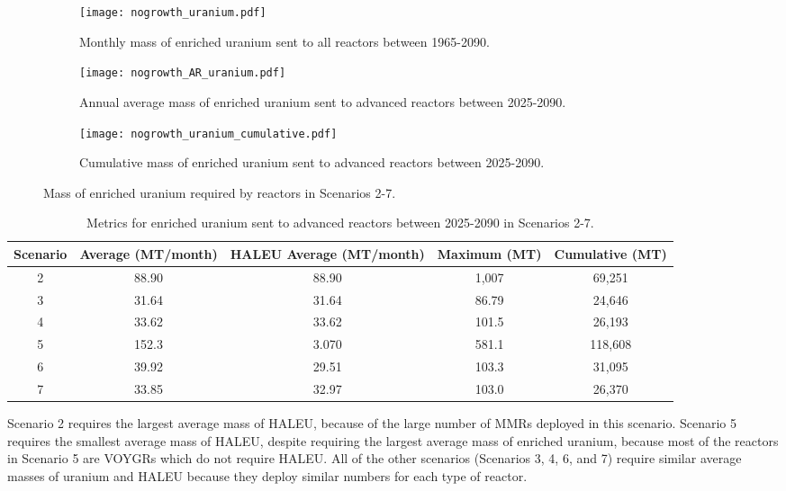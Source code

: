 \begin{figure}
    \centering
    \begin{subfigure}[b]{0.45\textwidth}
        \centering
        \texttt{[image: nogrowth\_uranium.pdf]}
        \caption{Monthly mass of enriched uranium sent to all reactors 
        between 1965-2090.}
        \label{fig:nogrowth_all_uranium}
    \end{subfigure}
    \hfill
    \begin{subfigure}[b]{0.45\textwidth}
        \centering
        \texttt{[image: nogrowth\_AR\_uranium.pdf]}
        \caption{Annual average mass of enriched uranium sent to 
        advanced reactors between 2025-2090.}
        \label{fig:nogrowth_AR_uranium}
    \end{subfigure}
    \begin{subfigure}[b]{0.45\textwidth}
        \centering
        \texttt{[image: nogrowth\_uranium\_cumulative.pdf]}
        \caption{Cumulative mass of enriched 
        uranium sent to advanced reactors between 2025-2090.}
        \label{fig:nogrowth_uranium_cumulative}
    \end{subfigure}
       \caption{Mass of enriched uranium required by reactors
        in Scenarios 2-7.}
       \label{fig:nogrowth_uranium}
\end{figure}

\begin{table}
    \centering 
    \caption{Metrics for enriched uranium sent to advanced 
    reactors between 2025-2090 in Scenarios 2-7.}
    \label{tab:nogrowth_uranium}
    \begin{tabular}{c c c c c}
        \hline
        Scenario & Average (MT/month) & \gls{HALEU} Average 
        (MT/month) & Maximum (MT)& Cumulative (MT)\\\hline
        2 & 88.90 & 88.90 & 1,007 & 69,251\\
        3 & 31.64 & 31.64 & 86.79 & 24,646\\
        4 & 33.62 & 33.62 & 101.5 & 26,193\\
        5 & 152.3 & 3.070 & 581.1 & 118,608\\
        6 & 39.92 & 29.51 & 103.3 & 31,095\\
        7 & 33.85 & 32.97 & 103.0 & 26,370\\
        \hline
    \end{tabular}
\end{table}

Scenario 2 requires the largest average mass of \gls{HALEU}, because 
of the large number of \glspl{MMR} deployed in this scenario. Scenario 
5 requires the smallest average mass of \gls{HALEU}, despite requiring the 
largest average mass of enriched uranium, because most of the 
reactors in Scenario 5 are VOYGRs which do not require \gls{HALEU}. 
All of the other scenarios (Scenarios 3, 4, 6, and 7) require similar 
average masses of uranium and \gls{HALEU} because they deploy similar 
numbers for each type of reactor. 

